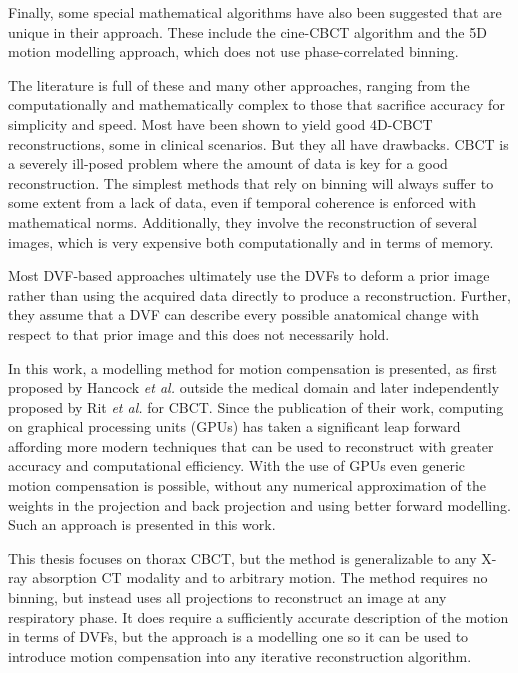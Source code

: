 Finally, some special mathematical algorithms have also been suggested that are unique in their approach.  These include the cine-CBCT algorithm\cite{6803058} and the 5D motion modelling approach\cite{0266-5611-31-11-115007}, which does not use phase-correlated binning.

The literature is full of these and many other approaches, ranging from the computationally and mathematically complex to those that sacrifice accuracy for simplicity and speed.  Most have been shown to yield good 4D-CBCT reconstructions, some in clinical scenarios.  But they all have drawbacks.  CBCT is a severely ill-posed problem where the amount of data is key for a good reconstruction.  The simplest methods that rely on binning will always suffer to some extent from a lack of data, even if temporal coherence is enforced with mathematical norms.  Additionally, they involve the reconstruction of several images, which is very expensive both computationally and in terms of memory.

Most DVF-based approaches ultimately use the DVFs to deform a prior image rather than using the acquired data directly to produce a reconstruction.  Further, they assume that a DVF can describe every possible anatomical change with respect to that prior image and this does not necessarily hold.

In this work, a modelling method for motion compensation is presented, as first proposed by Hancock \textit{et al.}\cite{pst1} outside the medical domain and later independently proposed by Rit \textit{et al.}\cite{Rit1}\cite{Rit2} for CBCT. Since the publication of their work, computing on graphical processing units (GPUs) has taken a significant leap forward affording more modern techniques that can be used to reconstruct with greater accuracy and computational efficiency. With the use of GPUs even generic motion compensation is possible, without any numerical approximation of the weights in the projection and back projection and using better forward modelling\cite{fwdproj}. Such an approach is presented in this work.

This thesis focuses on thorax CBCT, but the method is generalizable to any X-ray absorption CT modality and to arbitrary motion.  The method requires no binning, but instead uses all projections to reconstruct an image at any respiratory phase.  It does require a sufficiently accurate description of the motion in terms of DVFs, but the approach is a modelling one so it can be used to introduce motion compensation into any iterative reconstruction algorithm. 
